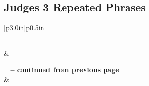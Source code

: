 \subsection{Judges 3 Repeated Phrases}


\normalsize
 
\begin{center}
\begin{longtable}{|p{3.0in}|p{0.5in}|}
\caption[Judges 3 Repeated Phrases]{Judges 3 Repeated Phrases}\label{table:Repeated Phrases Judges 3} \\
\hline {} &  \\ \hline 
\endfirsthead
 
{{\bfseries \tablename\ \thetable{} -- continued from previous page}} \\  
\hline {} &  \\ \hline 
\endhead
 

\end{longtable}
\end{center}
